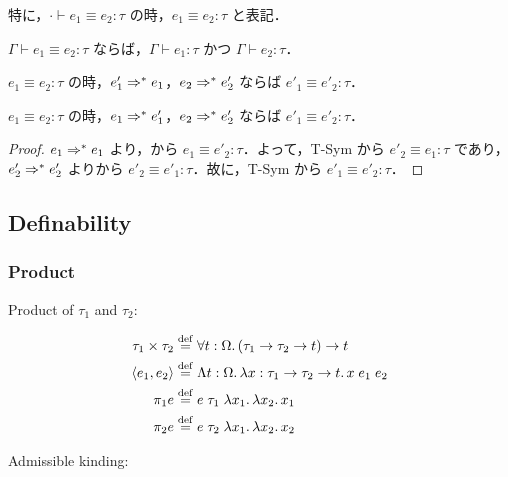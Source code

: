 特に，$\cdot \vdash e_1 \equiv e_2: \tau$ の時，$e_1 \equiv e_2: \tau$ と表記．

\begin{theorem}
  $\Gamma \vdash e_1 \equiv e_2: \tau$ ならば，$\Gamma \vdash e_1: \tau$ かつ $\Gamma \vdash e_2: \tau$．
\end{theorem}

\begin{theorem}
  $e_1 \equiv e_2: \tau$ の時，$e'_1 \Rightarrow^* e_1$，$e_2 \Rightarrow^* e'_2$ ならば $e'_1 \equiv e'_2: \tau$．
\end{theorem}

\begin{corollary}
  $e_1 \equiv e_2: \tau$ の時，$e_1 \Rightarrow^* e'_1$，$e_2 \Rightarrow^* e'_2$ ならば $e'_1 \equiv e'_2: \tau$．
\end{corollary}
\begin{proof}
  $e_1 \Rightarrow^* e_1$ より，から $e_1 \equiv e'_2: \tau$．よって，T-Sym から $e'_2 \equiv e_1: \tau$ であり，$e'_2 \Rightarrow^* e'_2$ よりから $e'_2 \equiv e'_1: \tau$．故に，T-Sym から $e'_1 \equiv e'_2: \tau$．
\end{proof}

\subsection{Definability}

\subsubsection{Product}

Product of $\tau_1$ and $\tau_2$:

\begin{align*}
  \tau_1 \times \tau_2 &\mathrel{\overset{\mathrm{def}}{=}} \forall t: \Omega\ldotp (\tau_1 \to \tau_2 \to t) \to t \\
  \langle e_1, e_2\rangle &\mathrel{\overset{\mathrm{def}}{=}} \Lambda t: \Omega\ldotp \lambda x: \tau_1 \to \tau_2 \to t\ldotp x\; e_1\; e_2 \\
  \pi_1 e &\mathrel{\overset{\mathrm{def}}{=}} e\; \tau_1\; \lambda x_1\ldotp \lambda x_2\ldotp x_1 \\
  \pi_2 e &\mathrel{\overset{\mathrm{def}}{=}} e\; \tau_2\; \lambda x_1\ldotp \lambda x_2\ldotp x_2
\end{align*}

Admissible kinding:

